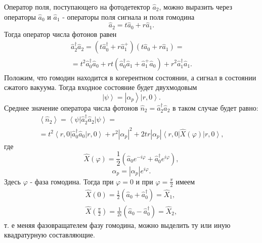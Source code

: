 Оператор поля, поступающего на фотодетектор $\hat{a}_2$, можно выразить
через операторы $\hat{a}_0$ и $\hat{a}_1$ - операторы поля сигнала и
поля гомодина
\begin{equation}
\hat{a}_2 = t \hat{a}_0 + r\hat{a}_1.
\nonumber
\end{equation}
Тогда оператор числа фотонов равен
\begin{eqnarray}
\hat{a}_2^{\dag}\hat{a}_2 = 
\left(t \hat{a}_0^{\dag} + r\hat{a}_1^{+}\right)
\left(t \hat{a}_0 + r\hat{a}_1\right) = 
\nonumber \\
=
t^2\hat{a}_0^{\dag}\hat{a}_0 + r t \left(
\hat{a}_0^{\dag}\hat{a}_1 + \hat{a}_1^{+}\hat{a}_0 
\right) +
r^2\hat{a}_1^{\dag}\hat{a}_1.
\nonumber
\end{eqnarray}
Положим, что гомодин находится в когерентном состоянии, а сигнал в
состоянии сжатого вакуума. Тогда входное состояние будет двухмодовым 
\[
\left|\psi\right> = 
\left|\alpha_p\right> \left|r, 0\right>.
\]
Среднее значение оператора числа фотонов $\hat{n}_2 =
\hat{a}_2^{\dag}\hat{a}_2$ в таком случае будет равно:
\begin{eqnarray}
\left<\hat{n}_2\right> = 
\left<\psi\right|\hat{a}_2^{\dag}\hat{a}_2\left|\psi\right> = 
\nonumber \\
=
t^2\left<r, 0\right|\hat{a}_0^{\dag}\hat{a}_0\left|r, 0\right> + 
r^2 \left|\alpha_p\right|^2 + 2 t r \left|\alpha_p\right|
\left<r, 0\right|\hat{X}\left(\varphi\right)\left|r, 0\right>,
\label{eqPart3SqueezedAdd3}
\end{eqnarray}
где
\[
\hat{X}\left(\varphi\right) = \frac{1}{2}\left(
\hat{a}_0 e^{-i \varphi} +
\hat{a}_0^{\dag} e^{i \varphi}
\right),
\]
\[
\alpha_p = 
\left|\alpha_p\right|
 e^{i \varphi}.
\]
Здесь $\varphi$ - фаза гомодина. Тогда при $\varphi = 0$ и при 
$\varphi = \frac{\pi}{2}$ имеем
\begin{eqnarray}
\hat{X}\left(0\right) = 
\frac{1}{2}\left(\hat{a}_0 + \hat{a}_0^{\dag}\right) = \hat{X}_1,
\nonumber \\
\hat{X}\left(\frac{\pi}{2}\right) = 
\frac{1}{2i}\left(\hat{a}_0 - \hat{a}_0^{\dag}\right) = \hat{X}_2,
\nonumber
\end{eqnarray}
т. е меняя фазовращателем фазу гомодина, можно выделить ту или иную
квадратурную составляющие.

